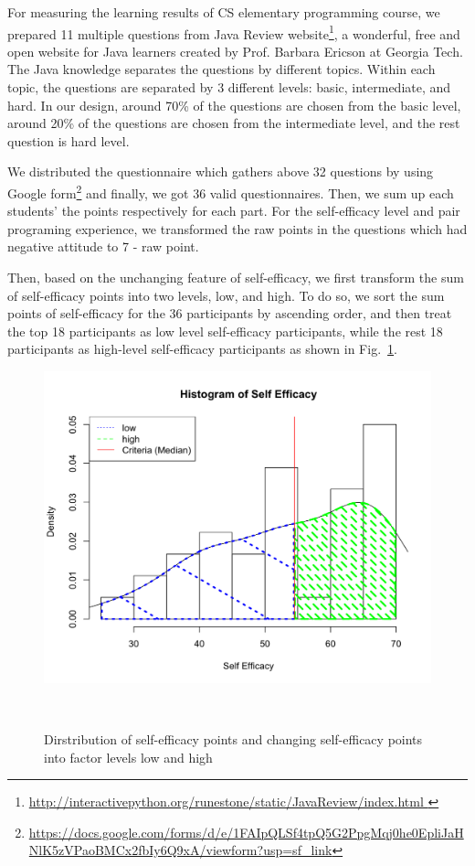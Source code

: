 \documentclass{sigchi}
\begin{document}
For measuring the learning results of CS elementary programming course, we prepared 11 multiple questions from Java Review website\footnote{\url{http://interactivepython.org/runestone/static/JavaReview/index.html }}, a wonderful, free and open website for Java learners created by Prof. Barbara Ericson at Georgia Tech.  The Java knowledge separates the questions by different topics. Within each topic, the questions are separated by 3 different levels: basic, intermediate, and hard. In our design, around 70\% of the questions are chosen from the basic level, around 20\% of the questions are chosen from the intermediate level, and the rest question is hard level. 

We distributed the questionnaire which gathers above 32  questions by using Google form\footnote{\url{https://docs.google.com/forms/d/e/1FAIpQLSf4tpQ5G2PpgMqj0he0EpliJaHNlK5zVPaoBMCx2fbIy6Q9xA/viewform?usp=sf_link}} and finally, we got 36 valid questionnaires. Then, we sum up each students' the points respectively for each part. For the self-efficacy level and pair programing experience,  we transformed the raw points in the questions which had negative attitude to 7 - raw point. 

Then, based on the unchanging feature of self-efficacy, we first transform the sum of self-efficacy points into two levels, low, and high. To do so, we sort the sum points of self-efficacy for the 36 participants by ascending order, and then treat the top 18 participants as low level self-efficacy participants, while the rest 18 participants as high-level self-efficacy participants as shown in Fig.~\ref{fig:figure1}.

\begin{figure}
\centering
  \includegraphics[width=0.9\columnwidth]{figures/hist1}
  \caption{Dirstribution of self-efficacy points and changing self-efficacy points into  factor levels low and high }~\label{fig:figure1}
\end{figure}
\end{document}
